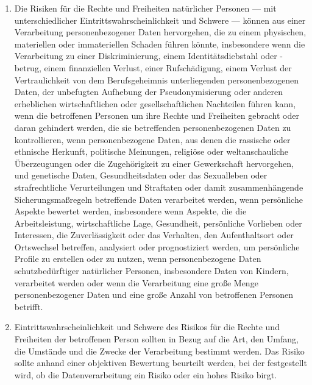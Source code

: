 \begin{enumerate}

   \item Die Risiken für die Rechte und Freiheiten natürlicher Personen — mit unterschiedlicher
    Eintrittswahrscheinlichkeit und Schwere — können aus einer Verarbeitung personenbezogener Daten hervorgehen, die zu
    einem physischen, materiellen oder immateriellen Schaden führen könnte, insbesondere wenn die Verarbeitung zu einer
    Diskriminierung, einem Identitätsdiebstahl oder -betrug, einem finanziellen Verlust, einer Rufschädigung, einem
    Verlust der Vertraulichkeit von dem Berufsgeheimnis unterliegenden personenbezogenen Daten, der unbefugten
    Aufhebung der Pseudonymisierung oder anderen erheblichen wirtschaftlichen oder gesellschaftlichen Nachteilen führen
    kann, wenn die betroffenen Personen um ihre Rechte und Freiheiten gebracht oder daran gehindert werden, die sie
    betreffenden personenbezogenen Daten zu kontrollieren, wenn personenbezogene Daten, aus denen die rassische oder
    ethnische Herkunft, politische Meinungen, religiöse oder weltanschauliche Überzeugungen oder die Zugehörigkeit zu
    einer Gewerkschaft hervorgehen, und genetische Daten, Gesundheitsdaten oder das Sexualleben oder strafrechtliche
    Verurteilungen und Straftaten oder damit zusammenhängende Sicherungsmaßregeln betreffende Daten verarbeitet werden,
    wenn persönliche Aspekte bewertet werden, insbesondere wenn Aspekte, die die Arbeitsleistung, wirtschaftliche Lage,
    Gesundheit, persönliche Vorlieben oder Interessen, die Zuverlässigkeit oder das Verhalten, den Aufenthaltsort oder
    Ortswechsel betreffen, analysiert oder prognostiziert werden, um persönliche Profile zu erstellen oder zu nutzen,
    wenn personenbezogene Daten schutzbedürftiger natürlicher Personen, insbesondere Daten von Kindern, verarbeitet
    werden oder wenn die Verarbeitung eine große Menge personenbezogener Daten und eine große Anzahl von betroffenen
    Personen betrifft.%
   \label{eg:75}
   

   \item Eintrittswahrscheinlichkeit und Schwere des Risikos für die Rechte und Freiheiten der betroffenen Person
    sollten in Bezug auf die Art, den Umfang, die Umstände und die Zwecke der Verarbeitung bestimmt werden. Das Risiko
    sollte anhand einer objektiven Bewertung beurteilt werden, bei der festgestellt wird, ob die Datenverarbeitung ein
    Risiko oder ein hohes Risiko birgt.%
   \label{eg:76}
   

\end{enumerate}
